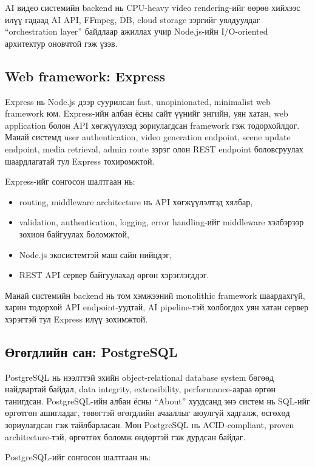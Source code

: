 AI видео системийн backend нь CPU-heavy video rendering-ийг өөрөө хийхээс илүү гадаад AI API, FFmpeg, DB, cloud storage зэргийг уялдуулдаг ``orchestration layer'' байдлаар ажиллах учир Node.js-ийн I/O-oriented архитектур оновчтой гэж үзэв.

\subsection{Web framework: Express}

Express нь Node.js дээр суурилсан fast, unopinionated, minimalist web framework юм. Express-ийн албан ёсны сайт үүнийг энгийн, уян хатан, web application болон API хөгжүүлэхэд зориулагдсан framework гэж тодорхойлдог. Манай системд user authentication, video generation endpoint, scene update endpoint, media retrieval, admin route зэрэг олон REST endpoint боловсруулах шаардлагатай тул Express тохиромжтой.

Express-ийг сонгосон шалтгаан нь:

\begin{itemize}
\item routing, middleware architecture нь API хөгжүүлэлтэд хялбар,
\item validation, authentication, logging, error handling-ийг middleware хэлбэрээр зохион байгуулах боломжтой,
\item Node.js экосистемтэй маш сайн нийцдэг,
\item REST API сервер байгуулахад өргөн хэрэглэгддэг.
\end{itemize}

Манай системийн backend нь том хэмжээний monolithic framework шаардахгүй, харин тодорхой API endpoint-уудтай, AI pipeline-тэй холбогдох уян хатан сервер хэрэгтэй тул Express илүү зохимжтой.

\subsection{Өгөгдлийн сан: PostgreSQL}

PostgreSQL нь нээлттэй эхийн object-relational database system бөгөөд найдвартай байдал, data integrity, extensibility, performance-аараа өргөн танигдсан. PostgreSQL-ийн албан ёсны ``About'' хуудсанд энэ систем нь SQL-ийг өргөтгөн ашигладаг, төвөгтэй өгөгдлийн ачааллыг аюулгүй хадгалж, өсгөхөд зориулагдсан гэж тайлбарласан. Мөн PostgreSQL нь ACID-compliant, proven architecture-тэй, өргөтгөх боломж өндөртэй гэж дурдсан байдаг.

PostgreSQL-ийг сонгосон шалтгаан нь:

